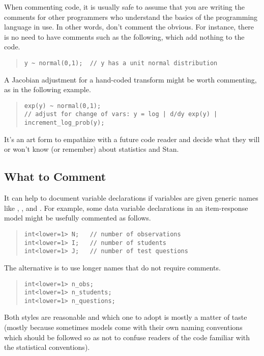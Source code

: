 When commenting code, it is usually safe to assume that you are 
writing the comments for other programmers who understand the basics 
of the programming language in use.  In other words, don't comment the
obvious.  For instance, there is no need to have comments
such as the following, which add nothing to the code.
%
\begin{quote}
\begin{Verbatim}[fontsize=\small]
y ~ normal(0,1);  // y has a unit normal distribution
\end{Verbatim}
\end{quote}
%
A Jacobian adjustment for a hand-coded transform might be worth
commenting, as in the following example.
%
\begin{quote}
\begin{Verbatim}[fontsize=\small]
exp(y) ~ normal(0,1);
// adjust for change of vars: y = log | d/dy exp(y) |
increment_log_prob(y);
\end{Verbatim}
\end{quote}
%
It's an art form to empathize with a future code reader and decide
what they will or won't know (or remember) about statistics and Stan.

\subsection{What to Comment}

It can help to document variable declarations if variables are given
generic names like , , and .  For
example, some data variable declarations in an item-response model
might be usefully commented as follows.
%
\begin{quote}
\begin{Verbatim}[fontsize=\small]
int<lower=1> N;   // number of observations
int<lower=1> I;   // number of students
int<lower=1> J;   // number of test questions
\end{Verbatim}
\end{quote}
%
The alternative is to use longer names that do not require comments.
%
\begin{quote}
\begin{Verbatim}[fontsize=\small]
int<lower=1> n_obs;
int<lower=1> n_students;
int<lower=1> n_questions;
\end{Verbatim}
\end{quote}
%
Both styles are reasonable and which one to adopt is mostly a matter of
taste (mostly because sometimes models come with their own naming
conventions which should be followed so as not to confuse readers of
the code familiar with the statistical conventions).

